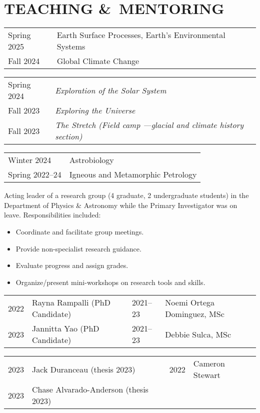 \section{TEACHING \&\ MENTORING}
\begin{tabular}{p{.15\linewidth} p{.85\linewidth}} %
	Spring 2025 & Earth Surface Processes, Earth's Environmental Systems\\
	Fall 2024 & Global Climate Change
\end{tabular}

\begin{tabular}{p{.15\linewidth} >{\itshape}l}
	Spring 2024 & Exploration of the Solar System \\
	Fall 2023 & Exploring the Universe \\
	Fall 2023 & The Stretch \normalfont (Field camp ---glacial and climate history section)
\end{tabular}

\begin{tabular}{p{.15\linewidth} p{.85\linewidth}} %
	Winter 2024 & Astrobiology\\
	Spring 2022--24 & Igneous and Metamorphic Petrology
\end{tabular}

Acting leader of a research group (4 graduate, 2 undergraduate students) in the Department of Physics \& Astronomy while the Primary Investigator was on leave. Responsibilities included:
\begin{itemize}
\item Coordinate and facilitate group meetings.
\item Provide non-specialist research guidance.
\item Evaluate progress and assign grades.
\item Organize/present mini-workshops on research tools and skills.
\end{itemize}

\begin{tabular}{ll|ll}
	2022\ongoing & Rayna Rampalli (PhD Candidate) 
	&
	2021--23 & Noemi Ortega Dominguez, MSc
	\\
	2023\ongoing & Jannitta Yao (PhD Candidate)
	&
	2021--23 & Debbie Sulca, MSc
\end{tabular}
\begin{tabular}{ll | ll}
	2023 & Jack Duranceau (thesis 2023) & 2022 & Cameron Stewart\\
	2023 & Chase Alvarado-Anderson (thesis 2023)\\
\end{tabular}

